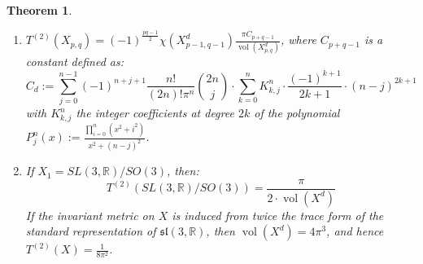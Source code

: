 \documentclass[11pt]{report}
\theoremstyle{definition}
\theoremstyle{plain}
\newtheorem{Theo}[Def]{Theorem}
\DeclareMathOperator{\vol}{vol}
\newcommand{\real}{\mathbb{R}}
\newcommand{\Lie}[1]{\mathfrak{#1}}
\begin{document}
\begin{Theo}
\begin{enumerate}[label*={\Roman*}]
\begin{enumerate}
\begin{equation}
			\end{equation}
			\item $T^{(2)}(X_{p,q})=(-1)^{\frac{pq-1}{2}}\chi(X^d_{p-1, q-1})\frac{\pi C_{p+q-1}}{\vol(X^d_{p,q})}$, where $C_{p+q-1}$ is a constant defined as:
			\begin{equation}
			C_{d}:=\sum_{j=0}^{n-1}(-1)^{n+j+1}\frac{n!}{(2n)!\pi^n}{2n \choose j}\cdot \sum_{k=0}^{n}K^n_{k,j}\cdot \frac{(-1)^{k+1}}{2k+1}\cdot (n-j)^{2k+1}
			\end{equation}
			with $K_{k,j}^n$ the integer coefficients at degree $2k$ of the polynomial $P^n_j(x):=\frac{\prod_{i=0}^{n}(x^2+i^2)}{x^2+(n-j)^2}$.
			\item If $X_1=SL(3, \real)/SO(3)$, then: 
			\begin{equation}
			T^{(2)}(SL(3, \real)/SO(3))=\frac{\pi}{2\cdot\vol(X^d)}
			\end{equation}
			If the invariant metric on $X$ is induced from twice the trace form of the standard representation of $\Lie{sl}(3, \real)$, then $\vol(X^d)=4\pi^3$, and hence $T^{(2)}(X)=\frac{1}{8\pi^2}$.
		\end{enumerate}
	\end{enumerate}
\end{Theo}


\pagebreak
\end{document}
